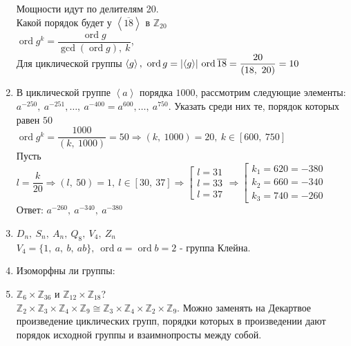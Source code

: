 \documentclass[12pt, letterpaper, twoside]{article}
\begin{document}
\begin{enumerate}
        Мощности идут по делителям 20.\\
        Какой порядок будет у $\left< \overline{18} \right>$ в $\mathbb{Z}_{20}$\\
        $\operatorname{ord} g^k = \dfrac{\operatorname{ord} g}{\gcd(\operatorname{ord} g),\ k}$,\\
        Для циклической группы $\left< g \right>,\ \operatorname{ord} g = \left| \left< g \right> \right|\\
        \operatorname{ord} \overline{18} = \dfrac{20}{(18,\ 20)} = 10$
        \item[Номер 2.] В циклической группе $\left< a \right>$ порядка $1000$, рассмотрим следующие элементы: $a^{-250},\ a^{-251},\dots,\ a^{-400} = a^{600},\dots,\ a^{750}$. Указать среди них те, порядок которых равен $50$\\
        $\operatorname{ord}g^k = \dfrac{1000}{(k,\ 1000)} = 50\Rightarrow (k,\ 1000) = 20,\ k\in [600,\ 750]$\\
        Пусть $l = \dfrac{k}{20}\Rightarrow (l,\ 50) = 1,\ l\in [30,\ 37]\Rightarrow \left[\begin{gathered}
            l = 31\\
            l = 33\\
            l = 37
        \end{gathered}\right. \Rightarrow \left[ \begin{gathered}
            k_1 = 620 = -380\\
            k_2 = 660 = -340\\
            k_3 = 740 = -260
        \end{gathered} \right.$\\
        Ответ: $a^{-260},\ a^{-340},\ a^{-380}$
        \item[Группы:] $D_n,\ S_n,\ A_n,\ Q_8,\ V_4,\ Z_n$\\
        $V_4 = \{1,\ a,\ b,\ ab\},\ \operatorname{ord} a = \operatorname{ord} b = 2$ - группа Клейна.
        \item[Номер 3.] Изоморфны ли группы:\\
        \item[а.]$\mathbb{Z}_6 \times \mathbb{Z}_{36}$ и $\mathbb{Z}_{12}\times \mathbb{Z}_{18}$?\\
        $\mathbb{Z}_2 \times \mathbb{Z}_3 \times \mathbb{Z}_4\times \mathbb{Z}_9 \cong \mathbb{Z}_3\times \mathbb{Z}_4 \times \mathbb{Z}_2 \times \mathbb{Z}_9$. Можно заменять на Декартвое произведение циклических групп, порядки которых в произведении дают порядок исходной группы и взаимнопросты между собой.

\end{enumerate}
\end{document}
